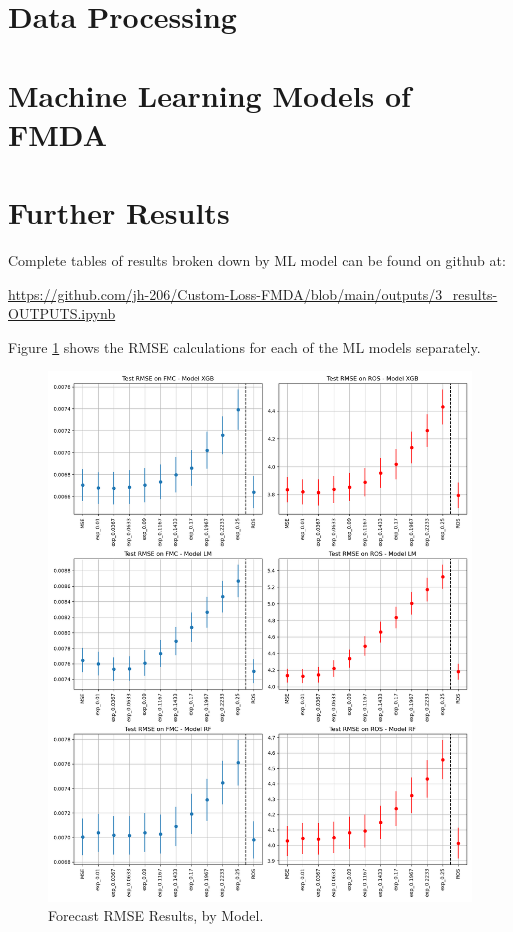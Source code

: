 \documentclass[11pt]{article}%
\begin{document}
\appendix
{}
\section{Data Processing} 
\label{app:data}

\section{Machine Learning Models of FMDA} 
\label{app:ml}


\section{Further Results}
\label{app:res}

Complete tables of results broken down by ML model can be found on github at: 

\url{https://github.com/jh-206/Custom-Loss-FMDA/blob/main/outputs/3_results-OUTPUTS.ipynb}

Figure \ref{fig:results2} shows the RMSE calculations for each of the ML models separately.

\begin{figure}[ht]
    \centering
    \includegraphics[width=1\textwidth]{images/results2.png}
    \caption{Forecast RMSE Results, by Model.}
    \label{fig:results2}
\end{figure}
\end{document}
